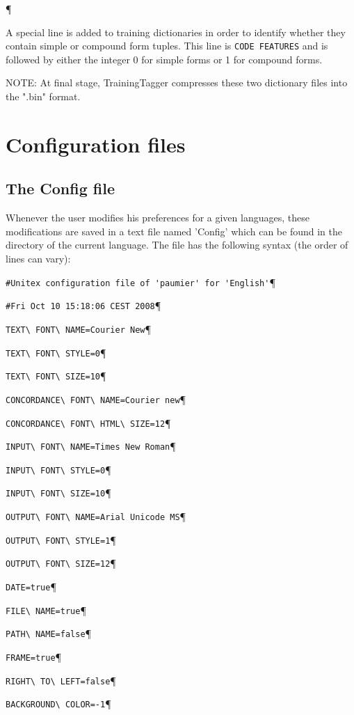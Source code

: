 \P

\bigskip
\noindent A special line is added to training dictionaries in order to identify whether they contain simple or compound
form tuples. This line is \verb+CODE FEATURES+ and is followed by either the integer 0 for simple forms or 1 for
compound forms.

\bigskip
\noindent NOTE: At final stage, TrainingTagger compresses these two dictionary files into the ".bin" format.


\section{Configuration files}
\subsection{The Config file}
Whenever the user modifies his preferences for a given languages, these
modifications are saved in a text file named 'Config' which can be found in the
directory of the current language. The file has the following syntax (the order
of lines can vary):


\bigskip
\verb$#Unitex configuration file of 'paumier' for 'English'$\P

\verb$#Fri Oct 10 15:18:06 CEST 2008$\P

\verb$TEXT\ FONT\ NAME=Courier New$\P

\verb$TEXT\ FONT\ STYLE=0$\P

\verb$TEXT\ FONT\ SIZE=10$\P

\verb$CONCORDANCE\ FONT\ NAME=Courier new$\P

\verb$CONCORDANCE\ FONT\ HTML\ SIZE=12$\P

\verb$INPUT\ FONT\ NAME=Times New Roman$\P

\verb$INPUT\ FONT\ STYLE=0$\P

\verb$INPUT\ FONT\ SIZE=10$\P

\verb$OUTPUT\ FONT\ NAME=Arial Unicode MS$\P

\verb$OUTPUT\ FONT\ STYLE=1$\P

\verb$OUTPUT\ FONT\ SIZE=12$\P

\verb$DATE=true$\P

\verb$FILE\ NAME=true$\P

\verb$PATH\ NAME=false$\P

\verb$FRAME=true$\P

\verb$RIGHT\ TO\ LEFT=false$\P

\verb$BACKGROUND\ COLOR=-1$\P


